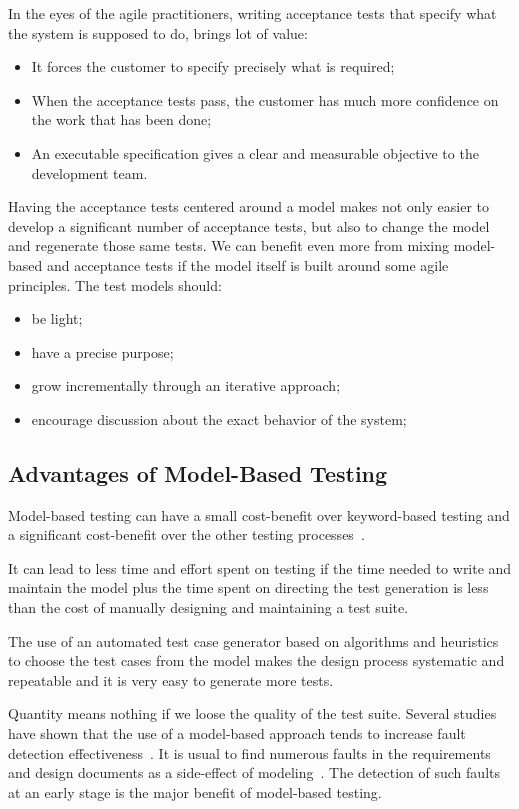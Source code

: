 In the eyes of the agile practitioners, writing acceptance tests
that specify what the system is supposed to do, brings lot of value:
\begin{itemize}
\item It forces the customer to specify precisely what is required;
\item When the acceptance tests pass, the customer has much more confidence on
the work that has been done;
\item An executable specification gives a clear and measurable 
objective to the development team.
\end{itemize}

\noindent Having the acceptance tests centered around a model makes not only
easier to develop a significant number of acceptance tests, but also to change
the model and regenerate those same tests. We can benefit even more from mixing
model-based and acceptance tests if the model itself is built around some agile
principles. The test models should:
\begin{itemize}
\item be light; 
\item have a precise purpose;
\item grow incrementally through an iterative approach;
\item encourage discussion about the exact behavior of the system;
\end{itemize}

\subsection{Advantages of Model-Based Testing}
Model-based testing can have a small cost-benefit over keyword-based testing and a significant cost-benefit over the other testing processes~\cite{1200168}.

It can lead to less time and effort spent on testing if the time needed to write and maintain the model plus the time spent on directing the test generation is less than the cost of manually designing and maintaining a test suite. 

The use of an automated test case generator based on algorithms and heuristics to choose the test cases from the model makes the design process systematic and repeatable and it is very easy to generate more tests.

Quantity means nothing if we loose the quality of the test
suite. Several studies have shown that the use of a
model-based approach tends to increase fault detection effectiveness~\cite{Dalal1999,Farchi2002}. It is usual to find numerous faults in the requirements and design documents as a side-effect of modeling~\cite{1200168}. The detection of such faults at an early stage is the major benefit of model-based testing.

